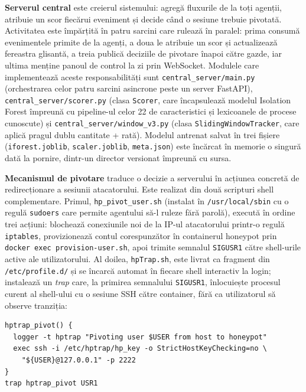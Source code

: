 \textbf{Serverul central} este creierul sistemului: agregă fluxurile de la
toți agenții, atribuie un scor fiecărui eveniment și decide când o sesiune
trebuie pivotată. Activitatea este împărțită în patru sarcini care rulează
în paralel: prima consumă evenimentele primite de la agenți, a doua le atribuie un scor
și actualizează fereastra glisantă, a treia publică deciziile de pivotare înapoi
către gazde, iar ultima menține panoul de control la zi prin WebSocket.
Modulele care implementează aceste responsabilități sunt
\texttt{central\_server/main.py} (orchestrarea celor patru sarcini asincrone
peste un server FastAPI), \texttt{central\_server/scorer.py} (clasa
\texttt{Scorer}, care încapsulează modelul Isolation Forest împreună cu
pipeline-ul celor 22 de caracteristici și lexicoanele de procese
cunoscute) și \texttt{central\_server/window\_v3.py} (clasa
\texttt{SlidingWindowTracker}, care aplică pragul dublu cantitate + rată).
Modelul antrenat salvat în trei fișiere
(\texttt{iforest.joblib}, \texttt{scaler.joblib}, \texttt{meta.json}) este
încărcat în memorie o singură dată la pornire, dintr-un director versionat
împreună cu sursa.

\textbf{Mecanismul de pivotare} traduce o decizie a serverului în acțiunea
concretă de redirecționare a sesiunii atacatorului. Este realizat din două
scripturi shell complementare. Primul, \texttt{hp\_pivot\_user.sh} (instalat
în \texttt{/usr/local/sbin} cu o regulă \texttt{sudoers} care permite agentului
să-l ruleze fără parolă), execută în ordine trei acțiuni: blochează
conexiunile noi de la IP-ul atacatorului printr-o regulă \texttt{iptables},
provizionează contul corespunzător în containerul honeypot prin
\texttt{docker exec provision-user.sh}, apoi trimite semnalul
\texttt{SIGUSR1} către shell-urile active ale utilizatorului. Al doilea,
\texttt{hpTrap.sh}, este livrat ca fragment din \texttt{/etc/profile.d/}
și se încarcă automat în fiecare shell interactiv la login; instalează un
\textit{trap} care, la primirea semnalului \texttt{SIGUSR1}, înlocuiește
procesul curent al shell-ului cu o sesiune SSH către container, fără ca
utilizatorul să observe tranziția:

\begin{lstlisting}[caption={Trap-ul instalat în fiecare shell interactiv (\texttt{hpTrap.sh})}, label={lst:cap5-trap}]
hptrap_pivot() {
  logger -t hptrap "Pivoting user $USER from host to honeypot"
  exec ssh -i /etc/hptrap/hp_key -o StrictHostKeyChecking=no \
    "${USER}@127.0.0.1" -p 2222
}
trap hptrap_pivot USR1
\end{lstlisting}


